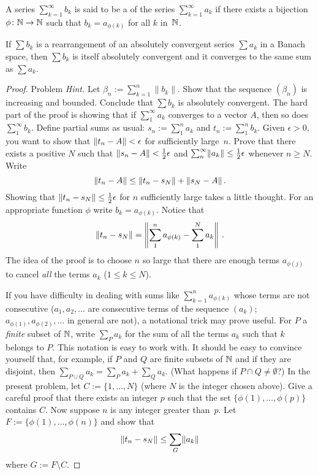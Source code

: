 \begin{defn}  A series $\sum_{k=1}^\infty b_k$ is said to be a
 of the series $\sum_{k=1}^\infty a_k$ if there exists a bijection
$\phi\colon \mathbb{N} \rightarrow \mathbb{N}$ such that $b_k = a_{\phi(k)}$ for all $k$ in~$\mathbb{N}$.
\end{defn}

\begin{prop}  If $\sum b_k$ is a rearrangement of an absolutely convergent series $\sum a_k$
in a Banach space, then $\sum b_k$ is itself absolutely convergent and it converges to the
same sum as $\sum a_k$.
\end{prop}

\begin{proof}  Problem    \emph{Hint.}   Let $\beta_n := \sum_{k=1}^n \|b_k\|$.  Show that the
sequence $(\beta_n)$ is increasing and bounded.  Conclude that $\sum b_k$ is absolutely
convergent.  The hard part of the proof is showing that if $\sum_1^\infty a_k$ converges to a
vector $A$, then so does $\sum_1^\infty b_k$.  Define partial sums as usual: $s_n := \sum_1^n
a_k$ and $t_n := \sum_1^n b_k$.  Given $\epsilon > 0$, you want to show that $\lVert t_n - A\rVert <
\epsilon$ for sufficiently large~$n$.  Prove that there exists a positive $N$ such that
$\lVert s_n - A\rVert < \frac12\epsilon$  and $\sum_n^\infty \lVert a_k\rVert \le \frac12\epsilon$
whenever $n \ge N$.  Write
  \[ \lVert t_n - A\rVert \le \lVert t_n - s_N\rVert + \lVert s_N - A\rVert\,. \]
Showing that $\lVert t_n - s_N\rVert \le \frac12 \epsilon$ for $n$ sufficiently large takes a little
thought.  For an appropriate function $\phi$ write $b_k = a_{\phi(k)}$.  Notice that
  \[ \lVert t_n - s_N\rVert = \left\lVert\sum_1^n a_{\phi(k)} - \sum_1^N a_k\right\rVert\,. \]
The idea of the proof is to choose $n$ so large that there are enough terms $a_{\phi(j)}$ to
cancel \emph{all} the terms $a_k$ ($1 \le k \le N$).

If you have difficulty in dealing with sums like $\sum_{k=1}^n a_{\phi(k)}$ whose terms are
not consecutive ($a_1,a_2,\dots$ are consecutive terms of the sequence $(a_k)$;
$a_{\phi(1)},a_{\phi(2)},\dots$ in general are not), a notational trick may prove useful.  For
$P$ a \emph{finite} subset of $\mathbb{N}$, write $\underset P{\sum} a_k$ for the sum of all the terms
$a_k$ such that $k$ belongs to $P$.  This notation is easy to work with. It should be easy to
convince yourself that, for example, if $P$ and $Q$ are finite subsets of $\mathbb{N}$ and if they are
disjoint, then $\underset{P \cup Q}{\sum} a_k = \underset P{\sum}a_k + \underset Q{\sum} a_k$.
(What happens if $P \cap Q \ne \emptyset$?)  In the present problem, let $C := \{1,\dots,N\}$
(where $N$ is the integer chosen above).  Give a careful proof that there exists an integer
$p$ such that the set $\{\phi(1),\dots,\phi(p)\}$ contains $C$. Now suppose $n$ is any integer
greater than~$p$. Let $F := \{\phi(1),\dots,\phi(n)\}$ and show that
 \[\lVert t_n - s_N\rVert \le \underset G{\sum} \lVert a_k\rVert\]
where $G := F\setminus C$.  \ns
\end{proof}

